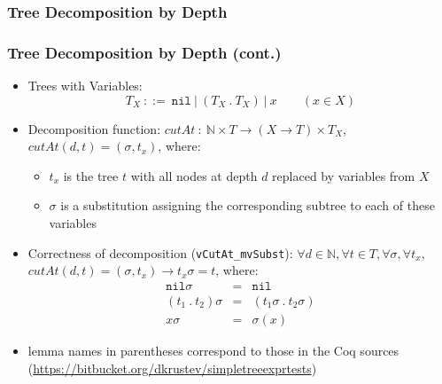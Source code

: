 \documentclass{beamer}
\begin{document}
\begin{frame}[fragile]
  \frametitle{Tree Decomposition by Depth}
  \begin{figure}
  \centering
  \end{figure}
\end{frame}

\begin{frame}
  \frametitle{Tree Decomposition by Depth (cont.)}
  \begin{itemize}
    \item Trees with Variables:
	  \[
		T_X ~::=~ \texttt{nil} ~|~ (T_X ~.~ T_X) ~|~ x \qquad (x \in X)
	  \]
    \item Decomposition function: 
      $\mathit{cutAt} ~:~ \mathbb{N} \times T \rightarrow (X \rightarrow T) \times T_X$,
      $cutAt(d, t) = (\sigma, t_x)$, where:
      \begin{itemize}
	    \item $t_x$ is the tree $t$ with all nodes at depth $d$ replaced by variables from $X$
	    \item $\sigma$ is a substitution assigning the corresponding subtree to each of these variables
	  \end{itemize}
	\item Correctness of decomposition (\texttt{vCutAt\_mvSubst}): 
	  $\forall d \in \mathbb{N}, \forall t \in T, \forall \sigma, \forall t_x,$
	  $cutAt(d, t) = (\sigma, t_x) \rightarrow t_x \sigma = t$, where:
	  \[\begin{array}{lcl}
	    \texttt{nil} \sigma & = & \texttt{nil} \\
	    (t_1 ~.~ t_2) \sigma & = & (t_1 \sigma ~.~ t_2 \sigma) \\
	    x \sigma & = & \sigma(x)
	  \end{array}
	  \]
	\item lemma names in parentheses correspond to those in the Coq sources
	  (\url{https://bitbucket.org/dkrustev/simpletreeexprtests})
  \end{itemize}
\end{frame}
\end{document}
